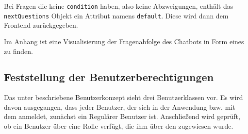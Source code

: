 Bei Fragen die keine \verb|condition| haben, also keine Abzweigungen, enthält das \verb|nextQuestions| Objekt ein Attribut namens \verb|default|. Diese wird dann dem Frontend zurückgegeben.

Im Anhang ist eine Visualisierung der Fragenabfolge des Chatbots in Form eines  zu finden.  

\subsection{Feststellung der Benutzerberechtigungen}
\label{sec:Planungsphase:Benutzerberechtigungen}

Das unter  beschriebene Benutzerkonzept sieht drei Benutzerklassen vor. Es wird davon ausgegangen, dass jeder Benutzer, der sich in der Anwendung bzw. mit dem  anmeldet, zunächst ein Regulärer Benutzer ist. Anschließend wird geprüft, ob ein Benutzer über eine Rolle verfügt, die ihm über den  zugewiesen wurde.
